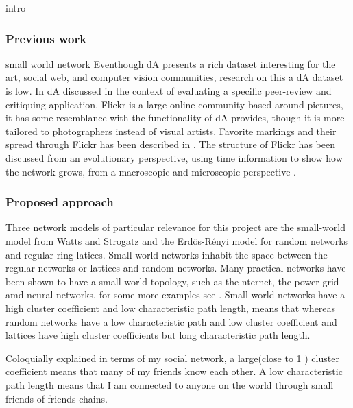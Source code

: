 intro

\subsubsection{Previous work}
small world network
Eventhough dA presents a rich dataset interesting for the art, social web, and computer vision communities, research on this a dA dataset is low. In \cite{DaMasters} dA discussed in the context of evaluating a specific peer-review and critiquing application.
Flickr is a large online community based around pictures, it has some resemblance with the functionality of dA provides, though it is more tailored to photographers instead of visual artists. Favorite markings and their spread through Flickr has been described in \cite{cha2009measurement}. The structure of Flickr has been discussed from an evolutionary perspective, using time information to show how the network grows, from a macroscopic \cite{kumar2006structure} and microscopic perspective \cite{leskovec2008microscopic}.


\subsubsection{Proposed approach}
Three network models of particular relevance for this project are the small-world model \cite{watts1998collective} from Watts and Strogatz and the Erd\"{o}s-R\'{e}nyi model for random networks \cite{erdos1960evolution} and regular ring latices. Small-world networks inhabit the space between the regular networks or lattices and random networks. Many practical networks have been shown to have a small-world topology, such as the nternet, the power grid amd neural networks,  for some more examples see \cite{albert2002statistical}. Small world-networks have a high cluster coefficient and low characteristic path length, means that  whereas random networks have a low characteristic path and low cluster coefficient and lattices have high cluster coefficients but long characteristic path length.

Coloquially explained in terms of my social network, a large(close to 1 ) cluster coefficient means that many of my friends know each other. A low characteristic path length means that I am connected to anyone on the world through small friends-of-friends chains.

